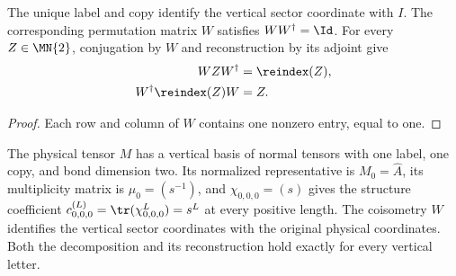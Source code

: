 \begin{lemma}%
    \label{thm:mpdo_bond_two_singleton_coisometry}
    \leanok
    The unique label and copy identify the vertical sector coordinate with
    $I$. The corresponding permutation matrix $W$ satisfies
    $WW^\dagger=\Id$. For every $Z\in\MN{2}$, conjugation by $W$ and
    reconstruction by its adjoint give
    \begin{align}
        WZW^\dagger           & =\reindex(Z),
        \notag                                \\
        W^\dagger\reindex(Z)W & =Z.
        \notag
    \end{align}
\end{lemma}
\begin{proof}\leanok
    Each row and column of $W$ contains one nonzero entry, equal to one.
\end{proof}

\begin{lemma}%
    \label{thm:mpdo_bond_two_singleton_tensor_clause}
    \leanok
    The physical tensor $M$ has a vertical basis of normal tensors with one label, one copy,
    and bond dimension two. Its normalized representative is
    $M_0=\widehat A$, its multiplicity matrix is $\mu_0=(s^{-1})$, and
    $\chi_{0,0,0}=(s)$ gives the structure coefficient
    $c_{0,0,0}^{(L)}=\tr(\chi_{0,0,0}^L)=s^L$ at every positive length.
    The coisometry $W$ identifies the vertical sector coordinates with the
    original physical coordinates. Both the decomposition and its
    reconstruction hold exactly for every vertical letter.
\end{lemma}
